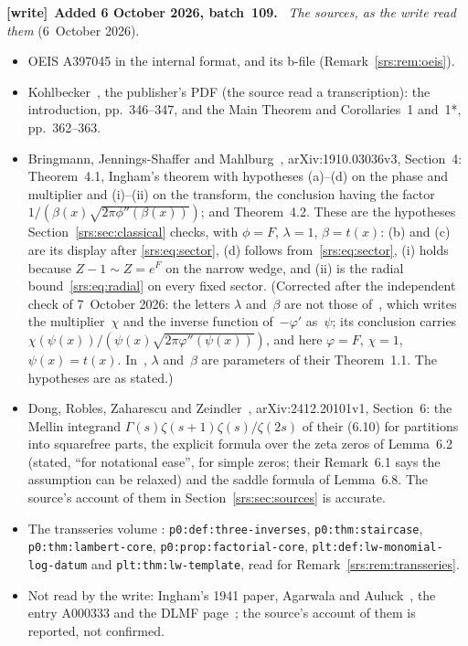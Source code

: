 \documentclass[11pt]{article}
\numberwithin{equation}{section}
\theoremstyle{remark}\newtheorem{remark}[theorem]{Remark}
\newcommand{\file}[1]{\nolinkurl{#1}}
\newenvironment{writenote}[1][]{\par\smallskip\begingroup\small
 \noindent\textbf{[write]}\if\relax\detokenize{#1}\relax\else~\textbf{#1.}\fi\ }%
 {\par\endgroup\smallskip}
\begin{document}
\begin{writenote}[Added 6 October 2026, batch~109]
\emph{The sources, as the write read them} (6~October 2026).
\begin{itemize}\raggedright
\item OEIS A397045 in the internal format, and its b-file
 (Remark~\ref{srs:rem:oeis}).
\item Kohlbecker~\cite{Kohlbecker}, the publisher's PDF (the source read a
 transcription): the introduction, pp.~346--347, and the Main Theorem and
 Corollaries~1 and~1*, pp.~362--363.
\item Bringmann, Jennings-Shaffer and Mahlburg~\cite{BJM}, arXiv:1910.03036v3,
 Section~4: Theorem~4.1, Ingham's theorem with hypotheses (a)--(d) on the
 phase and multiplier and (i)--(ii) on the transform, the conclusion having
 the factor $1/(\beta(x)\sqrt{2\pi\phi''(\beta(x))})$; and Theorem~4.2. These
 are the hypotheses Section~\ref{srs:sec:classical} checks, with
 $\phi=F$, $\lambda=1$, $\beta=t(x)$: (b) and (c) are its display after
 \eqref{srs:eq:sector}, (d) follows from~\eqref{srs:eq:sector}, (i) holds
 because $Z-1\sim Z=e^F$ on the narrow wedge, and (ii) is the radial
 bound~\eqref{srs:eq:radial} on every fixed sector. (Corrected after the
 independent check of 7~October 2026: the letters $\lambda$ and~$\beta$ are
 not those of~\cite[Theorem~4.1]{BJM}, which writes the multiplier~$\chi$
 and the inverse function of~$-\varphi'$ as~$\psi$; its conclusion carries
 $\chi(\psi(x))/(\psi(x)\sqrt{2\pi\varphi''(\psi(x))})$, and here
 $\varphi=F$, $\chi=1$, $\psi(x)=t(x)$. In~\cite{BJM}, $\lambda$ and~$\beta$
 are parameters of their Theorem~1.1. The hypotheses are as stated.)
\item Dong, Robles, Zaharescu and Zeindler~\cite{DRZZ}, arXiv:2412.20101v1,
 Section~6: the Mellin integrand $\Gamma(s)\zeta(s+1)\zeta(s)/\zeta(2s)$ of
 their (6.10) for partitions into squarefree parts, the explicit formula over
 the zeta zeros of Lemma~6.2 (stated, ``for notational ease'', for simple
 zeros; their Remark~6.1 says the assumption can be relaxed) and the saddle
 formula of Lemma~6.8. The source's account of them in
 Section~\ref{srs:sec:sources} is accurate.
\item The transseries volume
 :
 \file{p0:def:three-inverses}, \file{p0:thm:staircase},
 \file{p0:thm:lambert-core}, \file{p0:prop:factorial-core},
 \file{plt:def:lw-monomial-log-datum} and \file{plt:thm:lw-template}, read for
 Remark~\ref{srs:rem:transseries}.
\item Not read by the write: Ingham's 1941 paper, Agarwala and
 Auluck~\cite{AA}, the entry A000333 and the DLMF page~\cite{DLMF}; the
 source's account of them is reported, not confirmed.
\end{itemize}


\end{writenote}
\end{document}
